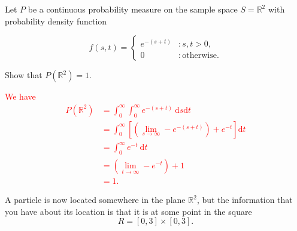\documentclass[12pt,reqno]{amsart}
\begin{document}
\bigskip
\prob Let $P$ be a continuous probability measure on the sample space $S=\mathbb{R}^2$ with probability density function

	\[
	f(s,t) = \begin{cases}
	e^{-(s+t)} & : s,t >0, \\
	0 & : \text{otherwise}.    
	\end{cases}
	\]

Show that $P(\mathbb{R}^2)=1$.


\bigskip
\textcolor{red}{We have
	\begin{align*}
	P(\mathbb{R}^2) &= \int_0^\infty \int_0^\infty e^{-(s+t)} \ \text{d}s \text{d}t \\
	&= \int_0^\infty \left[\left(\lim_{s\to\infty}-e^{-(s+t)}\right)+ e^{-t} \right]    \text{d}t \\
	&= \int_0^\infty e^{-t} \ \text{d} t \\
	&= \left( \lim_{t\to \infty} -e^{-t}  \right) +1 \\
	&= 1.
	\end{align*}}
\bigskip















\bigskip
\prob A particle is now located somewhere in the plane $\mathbb{R}^2$, but the  information that you have about its location is that it is at some point in the square
    \[R = [0,3] \times [0,3].\]
\end{document}
